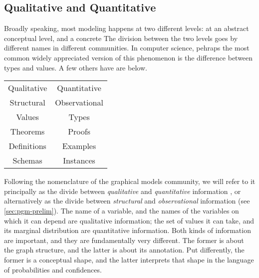 \subsection{Qualitative and Quantitative}

Broadly speaking, most modeling happens at two different levels: 
    at an abstract conceptual level, and a concrete 
The division between the two levels goes by different names in different communities. 
In computer science, pehraps the most common
    widely appreciated version of this phenomenon is 
    the difference between types and values.
A few others have are below.

\begin{center}
    \begin{tabular}{c|c}
        Qualitative & Quantitative \\ 
        Structural & Observational \\
        Values & Types \\ 
        Theorems & Proofs \\
        Definitions & Examples \\
        Schemas & Instances 
    \end{tabular}
    \end{center}
    
Following the nomenclature of the graphical models community, we will refer to it principally as the divide between \emph{qualitative} and \emph{quantitative} information 
\unskip, or alternatively as the divide between \emph{structural} and \emph{observational} information (see \cref{sec:pgm-prelim}).
The name of a variable, and the names of the variables on which it can depend are qualitative information; the set of values it can take, and its marginal distribution are quantitative information. 
%
Both kinds of information are important, and they are fundamentally very different. The former is about the graph structure, and the latter is about its annotation. Put differently,
the former is a conceptual shape, and the latter interprets that shape in the language of probabilities and confidences. 

